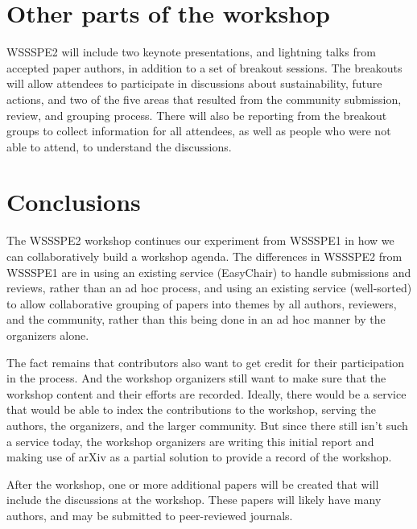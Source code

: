 \documentclass[11pt, oneside]{amsart}
\begin{document}
\section{Other parts of the workshop}

WSSSPE2 will include two keynote presentations, and lightning talks from accepted paper authors, in addition to a set of breakout sessions.  The breakouts will allow attendees to participate in discussions about sustainability, future actions, and two of the five areas that resulted from the community submission, review, and grouping process.  There will also be reporting from the breakout groups to collect information for all attendees, as well as people who were not able to attend, to understand the discussions.
 
\section{Conclusions}

The WSSSPE2 workshop continues our experiment from WSSSPE1 in how we can collaboratively build a workshop agenda.  The differences in WSSSPE2 from WSSSPE1 are in using an existing service (EasyChair) to handle submissions and reviews, rather than an ad hoc process, and using an existing service (well-sorted) to allow collaborative grouping of papers into themes by all authors, reviewers, and the community, rather than this being done in an ad hoc manner by the organizers alone.

The fact remains that contributors also want to get credit for their participation in the process.  And the workshop organizers still want to make sure that the workshop content and their efforts are recorded.  Ideally, there would be a service that would be able to index the contributions to the workshop, serving the authors, the organizers, and the larger community.  But since there still isn't such a service today, the workshop organizers are writing this initial report and making use of arXiv as a partial solution to provide a record of the workshop.

After the workshop, one or more additional papers will be created that will include the discussions at the workshop.  These papers will likely have many authors, and may be submitted to peer-reviewed journals.




\end{document}
